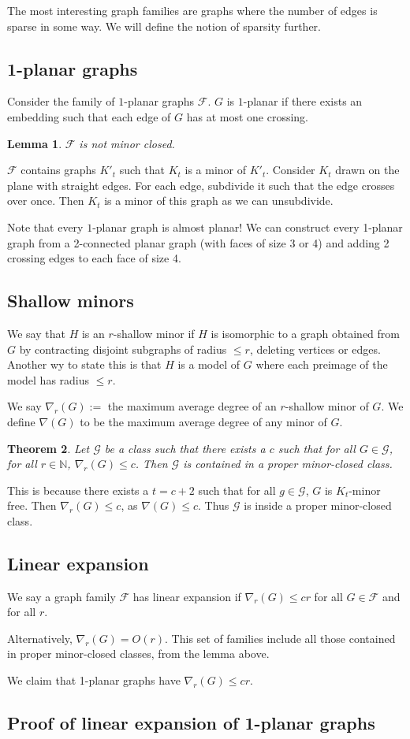 \documentclass[]{article}
\newtheorem{theorem}{Theorem}
\newtheorem{lemma}[theorem]{Lemma}
\theoremstyle{definition}
\numberwithin{theorem}{section}
\numberwithin{equation}{section}
\begin{document}
The most interesting graph families are graphs where the number of edges is sparse in some way. We will define the notion of sparsity further. 

\subsection{1-planar graphs} 
Consider the family of $1$-planar graphs $\mathcal{F}$. $G$ is $1$-planar if there exists an embedding such that each edge of $G$ has at most one crossing. 
\begin{lemma}
	$\mathcal{F}$ is not minor closed.
\end{lemma}
$\mathcal{F}$ contains graphs $K'_t$ such that $K_t$ is a minor of $K'_t$. Consider $K_t$ drawn on the plane with straight edges. For each edge, subdivide it such that the edge crosses over once. Then $K_t$ is a minor of this graph as we can unsubdivide.

Note that every $1$-planar graph is almost planar! We can construct every 1-planar graph from a 2-connected planar graph (with faces of size 3 or 4) and adding 2 crossing edges to each face of size 4.
\subsection{Shallow minors}
We say that $H$ is an $r$-shallow minor if $H$ is isomorphic to a graph obtained from $G$ by contracting disjoint subgraphs of radius $\leq r$, deleting vertices or edges. Another wy to state this is that $H$ is a model of $G$ where each preimage of the model has radius $\leq r$. 

We say $\nabla_r(G) :=$ the maximum average degree of an $r$-shallow minor of $G$. 
We define $\nabla(G)$ to be the maximum average degree of any minor of $G$. 

\begin{theorem}
	Let $\mathcal{G}$ be a class such that there exists a $c$ such that for all $G \in \mathcal{G}$, for all $r \in \mathbb{N}$, $\nabla_r(G) \leq c$. Then $\mathcal{G}$ is contained in a proper minor-closed class. 
\end{theorem}
This is because there exists a $t = c + 2$ such that for all $g \in \mathcal{G}$, $G$ is $K_t$-minor free. 
Then $\nabla_r(G) \leq c$, as $\nabla(G) \leq c$. 
Thus $\mathcal{G}$ is inside a proper minor-closed class. 

\subsection{Linear expansion}
We say a graph family $\mathcal{F}$ has linear expansion if $\nabla_r(G) \leq cr$ for all $G \in \mathcal{F}$ and for all $r$. 

Alternatively, $\nabla_r(G) = O(r)$. 
This set of families include all those contained in proper minor-closed classes, from the lemma above. 

We claim that 1-planar graphs have $\nabla_r(G) \leq cr$. 

\subsection{Proof of linear expansion of 1-planar graphs}
\end{document}
